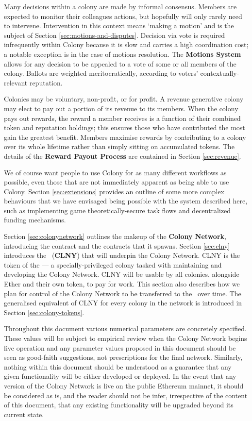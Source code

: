 Many decisions within a colony are made by informal consensus. Members are expected to monitor their colleagues actions, but hopefully will only rarely need to intervene. Intervention in this context means `making a motion' and is the subject of Section \ref{sec:motions-and-disputes}. Decision via vote is required infrequently within Colony because it is slow and carries a high coordination cost; a notable exception is in the case of motions resolution. The \textbf{Motions System} allows for any decision to be appealed to a vote of some or all members of the colony. Ballots are weighted meritocratically, according to voters' contextually-relevant reputation.

Colonies may be voluntary, non-profit, or for profit. A revenue generative colony may elect to pay out a portion of its revenue to its members. When the colony pays out rewards, the reward a member receives is a function of their combined token and reputation holdings; this ensures those who have contributed the most gain the greatest benefit. Members maximise rewards by contributing to a colony over its whole lifetime rather than simply sitting on accumulated tokens. The details of the \textbf{Reward Payout Process} are contained in Section \ref{sec:revenue}.

We of course want people to use Colony for as many different workflows as possible, even those that are not immediately apparent as being able to use Colony. Section \ref{sec:extensions} provides an outline of some more complex behaviours that we have envisaged being possible with the system described here, such as implementing game theoretically-secure task flows and decentralized funding mechanisms.

Section \ref{sec:colonynetwork} outlines the makeup of the \textbf{Colony Network}, introducing the  contract and the  contracts that it spawns. Section \ref{sec:clny} introduces the \rcts\ (\textbf{CLNY}) that will underpin the Colony Network. CLNY is the token of the \textbf{\rc} --- a specially-privileged colony tasked with maintaining and developing the Colony Network. CLNY will be usable by all colonies, alongside Ether and their own token, to pay for work. This section also describes how we plan for control of the Colony Network to be transferred to the \rc\ over time. The generalised equivalent of CLNY for every colony in the network is introduced in Section \ref{sec:colony-tokens}.

Throughout this document various numerical parameters are concretely specified. These values will be subject to empirical review when the Colony Network begins live operation and any parameter values proposed in this document should be seen as good-faith suggestions, not prescriptions for the final network. Similarly, nothing within this document should be understood as a guarantee that any given functionality will be either developed or deployed. In the event that any version of the Colony Network is live on the public Ethereum mainnet, it should be considered as is, and the reader should not be infer, irrespective of the content of this document, that any existing functionality will be upgraded beyond its current state.
